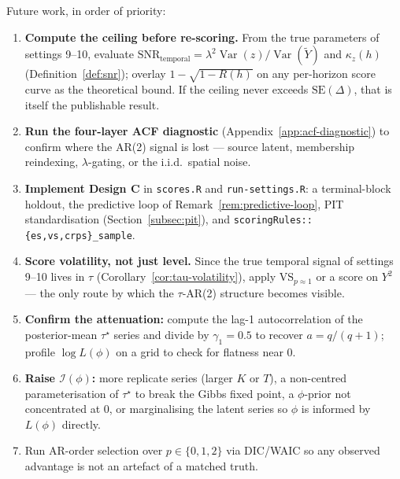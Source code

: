 \documentclass[11pt]{article}
\theoremstyle{definition}
\newcommand{\Var}{\operatorname{Var}}
\newcommand{\SNR}{\mathrm{SNR}_{\mathrm{temporal}}}
\begin{document}
Future work, in order of priority:
\begin{enumerate}[leftmargin=2em, itemsep=0pt]
  \item \textbf{Compute the ceiling before re-scoring.} From the true
        parameters of settings 9--10, evaluate
        $\SNR=\lambda^2\Var(z)/\Var(\widetilde Y)$ and $\kappa_z(h)$
        (Definition~\ref{def:snr}); overlay $1-\sqrt{1-R(h)}$ on any
        per-horizon score curve as the theoretical bound. If the
        ceiling never exceeds $\mathrm{SE}(\Delta)$, that is itself the
        publishable result.
  \item \textbf{Run the four-layer ACF diagnostic}
        (Appendix~\ref{app:acf-diagnostic}) to confirm where the AR(2)
        signal is lost --- source latent, membership reindexing,
        $\lambda$-gating, or the i.i.d.\ spatial noise.
  \item \textbf{Implement Design C} in \texttt{scores.R} and
        \texttt{run-settings.R}: a terminal-block holdout, the
        predictive loop of Remark~\ref{rem:predictive-loop}, PIT
        standardisation (Section~\ref{subsec:pit}), and
        \texttt{scoringRules::\{es,vs,crps\}\_sample}.
  \item \textbf{Score volatility, not just level.} Since the true
        temporal signal of settings 9--10 lives in $\tau$
        (Corollary~\ref{cor:tau-volatility}), apply
        $\mathrm{VS}_{p\approx1}$ or a score on $Y^2$ --- the only
        route by which the $\tau$-AR(2) structure becomes visible.
  \item \textbf{Confirm the attenuation:} compute the lag-1
        autocorrelation of the posterior-mean $\tau^\star$ series and
        divide by $\gamma_1=0.5$ to recover $a=q/(q+1)$; profile
        $\log L(\phi)$ on a grid to check for flatness near $0$.
  \item \textbf{Raise $\mathcal I(\phi)$:} more replicate series
        (larger $K$ or $T$), a non-centred parameterisation of
        $\tau^\star$ to break the Gibbs fixed point, a $\phi$-prior not
        concentrated at $0$, or marginalising the latent series so
        $\phi$ is informed by $L(\phi)$ directly.
  \item Run AR-order selection over $p\in\{0,1,2\}$ via DIC/WAIC so any
        observed advantage is not an artefact of a matched truth.
\end{enumerate}

\appendix
\end{document}
